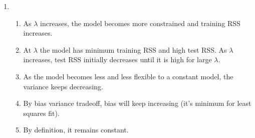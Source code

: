 \documentclass[../statistical_learning_notes.tex]{subfiles}
\begin{document}
\begin{enumerate}
        \item
        \begin{enumerate}
            \item As $\lambda$ increases, the model becomes more constrained and training RSS increases.
            \item At $\lambda$ the model has minimum training RSS and high test RSS. As $\lambda$ increases, test RSS initially decreases until it is high for large $\lambda$.
            \item As the model becomes less and less flexible to a constant model, the variance keeps decreasing.
            \item By bias variance tradeoff, bias will keep increasing (it's minimum for least squares fit).
            \item By definition, it remains constant.
        \end{enumerate}
        

\end{enumerate}
\end{document}
